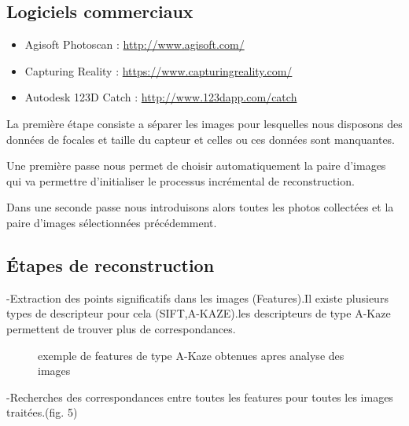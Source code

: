 \documentclass[a4paper,10pt,french]{sphinxhowto}
\begin{document}
\subsection{\textbf{Logiciels commerciaux}}
\label{Sfm:logiciels-commerciaux}\begin{itemize}
\item {} 
Agisoft Photoscan : \href{http://www.agisoft.com/}{http://www.agisoft.com/}

\item {} 
Capturing Reality : \href{https://www.capturingreality.com/}{https://www.capturingreality.com/}

\item {} 
Autodesk 123D Catch : \href{http://www.123dapp.com/catch}{http://www.123dapp.com/catch}

\end{itemize}

\begin{DUlineblock}{0em}
\item[] La première étape consiste a séparer les images pour lesquelles nous disposons des données de focales et taille du capteur et celles ou ces données sont manquantes.
\item[] Une première passe nous permet de choisir automatiquement la paire d'images qui va permettre d'initialiser le processus incrémental de reconstruction.
\item[] Dans une seconde passe nous introduisons alors toutes les photos collectées et la paire d'images sélectionnées précédemment.
\end{DUlineblock}


\subsection{\textbf{Étapes de reconstruction}}
\label{Sfm:etapes-de-reconstruction}
-Extraction des points significatifs dans les images (Features).Il existe plusieurs types de descripteur pour cela (SIFT,A-KAZE).les descripteurs de type A-Kaze permettent de trouver plus de correspondances.
\begin{figure}[htbp]
\centering
\capstart

\caption{exemple de features de type A-Kaze obtenues apres analyse des images}\end{figure}

-Recherches des correspondances entre toutes les features pour toutes les images traitées.(fig. 5)
\end{document}
